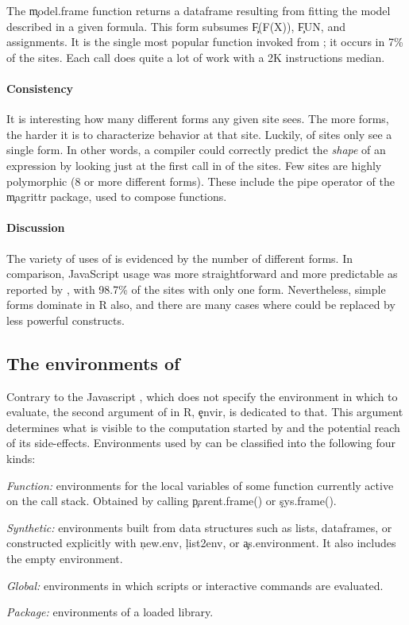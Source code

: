 \documentclass[review,screen,acmsmall]{acmart}
\begin{document}
\medskip\noindent{} The \c{model.frame} function
returns a dataframe resulting from fitting the model described in a given
formula. This form subsumes \c{F(F(X))}, \c{FUN}, and assignments. It is the
single most popular function invoked from \eval; it occurs in 7\% of the sites.
Each call does quite a lot of work with a 2K instructions median.

\paragraph{Consistency} It is interesting how many different
forms any given site sees. The more forms, the harder it is to characterize
behavior at that site. Luckily, \packageNbOneMinimizedPercent of sites only see
a single form. In other words, a compiler could correctly predict the
\emph{shape} of an expression by looking just at the first call in
\packageNbOneMinimizedPercent of the sites. Few sites are highly polymorphic (8
or more different forms). These include the pipe operator of the \c{magrittr}
package, used to compose functions.

\paragraph{Discussion} The variety of uses of \eval is evidenced by the number
of different forms. In comparison, JavaScript \eval usage was more
straightforward and more predictable as reported by \citet{oopsla12b}, with
98.7\% of the sites with only one form. Nevertheless, simple forms dominate in R
also, and there are many cases where \eval could be replaced by less powerful
constructs.


\subsection{The environments of \eval}\label{sec:env}

Contrary to the Javascript \eval, which does not specify the environment in
which to evaluate, the second argument of \eval in R, \c{envir}, is dedicated to
that. This argument determines what is visible to the computation started by
\eval and the potential reach of its side-effects. Environments used by \eval
can be classified into the following four kinds:

\begin{compactitem}[---]
\item \emph{Function:} environments for the local variables of some function
  currently active on the call stack. Obtained by calling \c{parent.frame()} or
  \c{sys.frame()}.
\item \emph{Synthetic:} environments built from data structures such as lists,
  dataframes, or constructed explicitly with \c{new.env}, \c{list2env}, or
  \c{as.environment}. It also includes the empty environment.
\item \emph{Global:}  environments in which scripts or interactive commands
  are evaluated.
\item \emph{Package:}  environments of a loaded library.
\end{compactitem}
\end{document}

